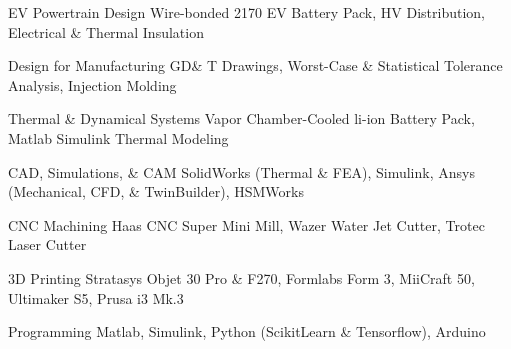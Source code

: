 


\begin{cvskills}





\cvskill
{EV Powertrain Design}
{Wire-bonded 2170 EV Battery Pack, HV Distribution, Electrical \& Thermal Insulation}

\cvskill
{Design for Manufacturing}
{GD\& T Drawings, Worst-Case \& Statistical Tolerance Analysis, Injection Molding}

\cvskill
{Thermal \& Dynamical Systems}
{Vapor Chamber-Cooled li-ion Battery Pack, Matlab Simulink Thermal Modeling}

\cvskill
{CAD, Simulations, \& CAM} %
{SolidWorks (Thermal \& FEA), Simulink, Ansys (Mechanical, CFD, \& TwinBuilder), HSMWorks} %

\cvskill
{CNC Machining}
{Haas CNC Super Mini Mill, Wazer Water Jet Cutter, Trotec Laser Cutter}

\cvskill
{3D Printing} %
{Stratasys Objet 30 Pro \& F270, Formlabs Form 3, MiiCraft 50, Ultimaker S5, Prusa i3 Mk.3} %

\cvskill
{Programming} %
{Matlab, Simulink, Python (ScikitLearn \& Tensorflow), Arduino} %



\end{cvskills}